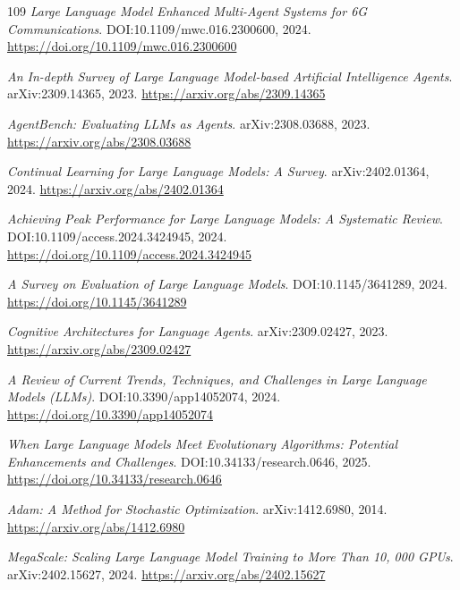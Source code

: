 \documentclass[11pt,a4paper]{article}
\begin{document}
\begin{thebibliography}{109}
\newblock \emph{Large Language Model Enhanced Multi-Agent Systems for 6G Communications}.
\newblock DOI:10.1109/mwc.016.2300600, 2024.
\newblock \url{https://doi.org/10.1109/mwc.016.2300600}

\newblock \emph{An In-depth Survey of Large Language Model-based Artificial Intelligence Agents}.
\newblock arXiv:2309.14365, 2023.
\newblock \url{https://arxiv.org/abs/2309.14365}

\newblock \emph{AgentBench: Evaluating LLMs as Agents}.
\newblock arXiv:2308.03688, 2023.
\newblock \url{https://arxiv.org/abs/2308.03688}

\newblock \emph{Continual Learning for Large Language Models: A Survey}.
\newblock arXiv:2402.01364, 2024.
\newblock \url{https://arxiv.org/abs/2402.01364}

\newblock \emph{Achieving Peak Performance for Large Language Models: A Systematic Review}.
\newblock DOI:10.1109/access.2024.3424945, 2024.
\newblock \url{https://doi.org/10.1109/access.2024.3424945}

\newblock \emph{A Survey on Evaluation of Large Language Models}.
\newblock DOI:10.1145/3641289, 2024.
\newblock \url{https://doi.org/10.1145/3641289}

\newblock \emph{Cognitive Architectures for Language Agents}.
\newblock arXiv:2309.02427, 2023.
\newblock \url{https://arxiv.org/abs/2309.02427}

\newblock \emph{A Review of Current Trends, Techniques, and Challenges in Large Language Models (LLMs)}.
\newblock DOI:10.3390/app14052074, 2024.
\newblock \url{https://doi.org/10.3390/app14052074}

\newblock \emph{When Large Language Models Meet Evolutionary Algorithms: Potential Enhancements and Challenges}.
\newblock DOI:10.34133/research.0646, 2025.
\newblock \url{https://doi.org/10.34133/research.0646}

\newblock \emph{Adam: A Method for Stochastic Optimization}.
\newblock arXiv:1412.6980, 2014.
\newblock \url{https://arxiv.org/abs/1412.6980}

\newblock \emph{MegaScale: Scaling Large Language Model Training to More Than 10, 000 GPUs}.
\newblock arXiv:2402.15627, 2024.
\newblock \url{https://arxiv.org/abs/2402.15627}


\end{thebibliography}
\end{document}
